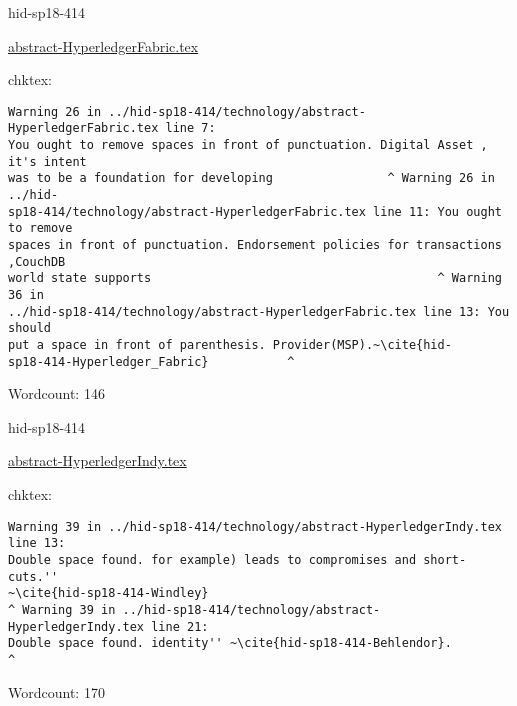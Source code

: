 

\begin{IU}

hid-sp18-414

\href{https://github.com/cloudmesh-community/hid-sp18-414/blob/master//technology/abstract-HyperledgerFabric.tex}{abstract-HyperledgerFabric.tex}

 
chktex:
\begin{tiny}
\begin{verbatim}
Warning 26 in ../hid-sp18-414/technology/abstract-HyperledgerFabric.tex line 7:
You ought to remove spaces in front of punctuation. Digital Asset , it's intent
was to be a foundation for developing                ^ Warning 26 in ../hid-
sp18-414/technology/abstract-HyperledgerFabric.tex line 11: You ought to remove
spaces in front of punctuation. Endorsement policies for transactions ,CouchDB
world state supports                                        ^ Warning 36 in
../hid-sp18-414/technology/abstract-HyperledgerFabric.tex line 13: You should
put a space in front of parenthesis. Provider(MSP).~\cite{hid-
sp18-414-Hyperledger_Fabric}           ^
\end{verbatim}
\end{tiny}

Wordcount: 146

\end{IU}



\begin{IU}

hid-sp18-414

\href{https://github.com/cloudmesh-community/hid-sp18-414/blob/master//technology/abstract-HyperledgerIndy.tex}{abstract-HyperledgerIndy.tex}

 
chktex:
\begin{tiny}
\begin{verbatim}
Warning 39 in ../hid-sp18-414/technology/abstract-HyperledgerIndy.tex line 13:
Double space found. for example) leads to compromises and short-cuts.''
~\cite{hid-sp18-414-Windley}
^ Warning 39 in ../hid-sp18-414/technology/abstract-HyperledgerIndy.tex line 21:
Double space found. identity'' ~\cite{hid-sp18-414-Behlendor}.             ^
\end{verbatim}
\end{tiny}

Wordcount: 170

\end{IU}

